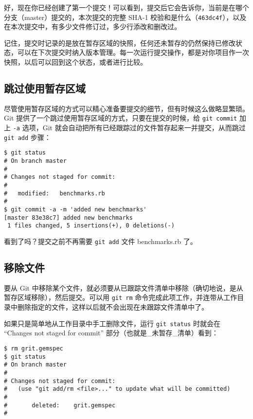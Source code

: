 \documentclass[a4paper]{book}
\begin{document}
好，现在你已经创建了第一个提交！可以看到，提交后它会告诉你，当前是在哪个分支（master）提交的，本次提交的完整 SHA-1 校验和是什么（\texttt{463dc4f}），以及在本次提交中，有多少文件修订过，多少行添改和删改过。

记住，提交时记录的是放在暂存区域的快照，任何还未暂存的仍然保持已修改状态，可以在下次提交时纳入版本管理。每一次运行提交操作，都是对你项目作一次快照，以后可以回到这个状态，或者进行比较。

\subsection{跳过使用暂存区域}

尽管使用暂存区域的方式可以精心准备要提交的细节，但有时候这么做略显繁琐。Git 提供了一个跳过使用暂存区域的方式，只要在提交的时候，给 \texttt{git commit} 加上 \texttt{-a} 选项，Git 就会自动把所有已经跟踪过的文件暂存起来一并提交，从而跳过 \texttt{git add} 步骤：

\begin{shaded}\begin{verbatim}
$ git status
# On branch master
#
# Changes not staged for commit:
#
#	modified:   benchmarks.rb
#
$ git commit -a -m 'added new benchmarks'
[master 83e38c7] added new benchmarks
 1 files changed, 5 insertions(+), 0 deletions(-)
\end{verbatim}\end{shaded}

看到了吗？提交之前不再需要 \texttt{git add} 文件 benchmarks.rb 了。

\subsection{移除文件}

要从 Git 中移除某个文件，就必须要从已跟踪文件清单中移除（确切地说，是从暂存区域移除），然后提交。可以用 \texttt{git rm} 命令完成此项工作，并连带从工作目录中删除指定的文件，这样以后就不会出现在未跟踪文件清单中了。

如果只是简单地从工作目录中手工删除文件，运行 \texttt{git status} 时就会在 “Changes not staged for commit” 部分（也就是\_未暂存\_清单）看到：

\begin{shaded}\begin{verbatim}
$ rm grit.gemspec
$ git status
# On branch master
#
# Changes not staged for commit:
#   (use "git add/rm <file>..." to update what will be committed)
#
#       deleted:    grit.gemspec
#
\end{verbatim}\end{shaded}
\end{document}
